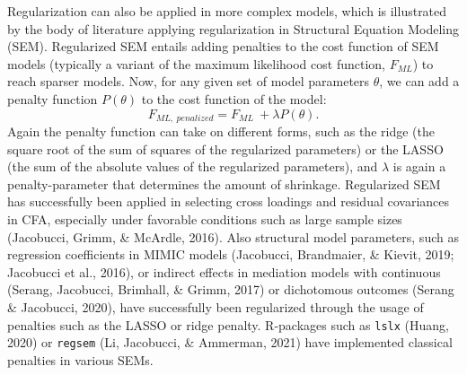 \documentclass[
  man, donotrepeattitle,floatsintext]{apa6}
\begin{document}
Regularization can also be applied in more complex models, which is
illustrated by the body of literature applying regularization in
Structural Equation Modeling (SEM). Regularized SEM entails adding
penalties to the cost function of SEM models (typically a variant of the
maximum likelihood cost function, \(F_{ML}\)) to reach sparser models.
Now, for any given set of model parameters \(\theta\), we can add a
penalty function \(P(\theta)\) to the cost function of the model:
\[F_{ML, \ penalized} = F_{ML} \ + \lambda P(\theta).\] Again the
penalty function can take on different forms, such as the ridge (the
square root of the sum of squares of the regularized parameters) or the
LASSO (the sum of the absolute values of the regularized parameters),
and \(\lambda\) is again a penalty-parameter that determines the amount of
shrinkage. Regularized SEM has successfully been applied in selecting
cross loadings and residual covariances in CFA, especially under
favorable conditions such as large sample sizes
(Jacobucci, Grimm, \& McArdle, 2016). Also structural model parameters, such as
regression coefficients in MIMIC models (Jacobucci, Brandmaier, \& Kievit, 2019; Jacobucci et al., 2016), or indirect effects in mediation models with
continuous (Serang, Jacobucci, Brimhall, \& Grimm, 2017) or dichotomous outcomes
(Serang \& Jacobucci, 2020), have successfully been regularized through
the usage of penalties such as the LASSO or ridge penalty. R-packages
such as \texttt{lslx} (Huang, 2020) or \texttt{regsem}
(Li, Jacobucci, \& Ammerman, 2021) have implemented classical penalties in various SEMs.
\end{document}
